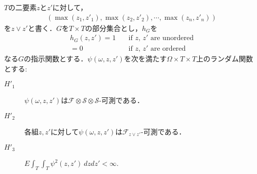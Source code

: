 	$T$の二要素$z$と$z'$に対して，
	\begin{align}
		(\max{(z_{1},z'_{1})}, \max{(z_{2},z'_{2})}, \cdots, \max{(z_{n},z'_{n})})
	\end{align}
	を$z \vee z'$と書く．$G$を$T \times T$の部分集合とし，$h_{G}$を
	\begin{align}
		h_{G}(z,z')
		= 1 \quad & \mbox{if $z$, $z'$ are unordered} \\
		= 0 \quad & \mbox{if $z$, $z'$ are ordered}
	\end{align}
	なる$G$の指示関数とする．$\psi(\omega,z,z')$を次を満たす$\Omega \times T \times T$上のランダム関数とする:
	\begin{description}
		\item[$H'_{1}$] $\psi(\omega,z,z')$は$\mathscr{F} \otimes \mathscr{S} \otimes \mathscr{S}$-可測である．
		
		\item[$H'_{2}$] 各組$z,z'$に対して$\psi(\omega,z,z')$は$\mathscr{F}_{z \vee z'}$-可測である．
		
		\item[$H'_{3}$] $E \int_{T} \int_{T} \psi^{2}(z,z')\ dzdz' < \infty$. 
	\end{description}
	
